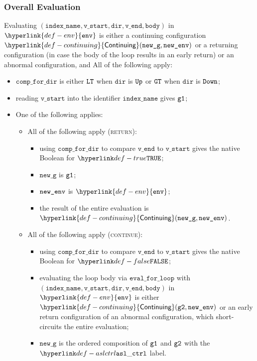 \documentclass{book}
\newcommand\Continuing[0]{\hyperlink{def-continuing}{\textsf{Continuing}}}
\newcommand\env[0]{\hyperlink{def-env}{\texttt{env}}}
\newcommand\newg[0]{\texttt{new\_g}}
\newcommand\vstart[0]{\texttt{v\_start}}
\newcommand\vend[0]{\texttt{v\_end}}
\newcommand\vbody[0]{\texttt{body}}
\newcommand\dir[0]{\texttt{dir}}
\newcommand\vindexname[0]{\texttt{index\_name}}
\newcommand\compfordir[0]{\texttt{comp\_for\_dir}}
\newcommand\evalforloop[0]{\texttt{eval\_for\_loop}}
\begin{document}
\subsubsection{Overall Evaluation}

Evaluating $(\vindexname, \vstart, \dir, \vend, \vbody)$ in $\env$ is either
a continuing configuration $\Continuing(\newg, \newenv)$ or a returning configuration
(in case the body of the loop results in an early return)
or an abnormal configuration,
and All of the following apply:
\begin{itemize}
  \item $\compfordir$ is either $\texttt{LT}$ when $\dir$ is $\texttt{Up}$ or $\texttt{GT}$ when $\dir$ is $\texttt{Down}$;
  \item reading $\vstart$ into the identifier $\vindexname$ gives $\texttt{g1}$;
  \item One of the following applies:
    \begin{itemize}
    \item All of the following apply (\textsc{return}):
    \begin{itemize}
      \item using $\compfordir$ to compare $\vend$ to $\vstart$ gives the native Boolean for $\True$;
      \item $\newg$ is $\texttt{g1}$;
      \item $\texttt{new\_env}$ is $\env$;
      \item the result of the entire evaluation is $\Continuing(\newg, \newenv)$.
    \end{itemize}
    \item All of the following apply (\textsc{continue}):
    \begin{itemize}
      \item using $\compfordir$ to compare $\vend$ to $\vstart$ gives the native Boolean for $\False$;
      \item evaluating the loop body via $\evalforloop$ with \\ $(\vindexname, \vstart, \dir, \vend, \vbody)$
      in $\env$ is either \\ $\Continuing(\vgtwo, \newenv)$ or an early return configuration
      of an abnormal configuration, which short-circuits the entire evaluation;
      \item $\newg$ is the ordered composition of $\texttt{g1}$ and $\texttt{g2}$ with the $\aslctrl$ label.
    \end{itemize}
  \end{itemize}
\end{itemize}
\end{document}
